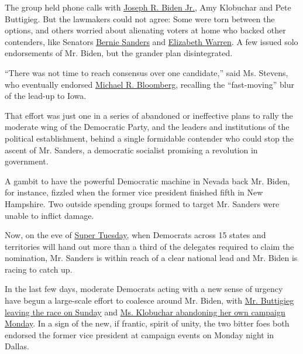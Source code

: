 The group held phone calls with
\href{https://www.nytimes3xbfgragh.onion/2020/03/03/podcasts/the-daily/the-stakes-on-super-tuesday.html}{Joseph
R. Biden Jr.}, Amy Klobuchar and Pete Buttigieg. But the lawmakers could
not agree: Some were torn between the options, and others worried about
alienating voters at home who backed other contenders, like Senators
\href{https://www.nytimes3xbfgragh.onion/interactive/2020/us/elections/bernie-sanders.html}{Bernie
Sanders} and
\href{https://www.nytimes3xbfgragh.onion/interactive/2020/us/elections/elizabeth-warren.html}{Elizabeth
Warren}. A few issued solo endorsements of Mr. Biden, but the grander
plan disintegrated.

``There was not time to reach consensus over one candidate,'' said Ms.
Stevens, who eventually endorsed
\href{https://www.nytimes3xbfgragh.onion/interactive/2020/us/elections/michael-bloomberg.html}{Michael
R. Bloomberg}, recalling the ``fast-moving'' blur of the lead-up to
Iowa.

That effort was just one in a series of abandoned or ineffective plans
to rally the moderate wing of the Democratic Party, and the leaders and
institutions of the political establishment, behind a single formidable
contender who could stop the ascent of Mr. Sanders, a democratic
socialist promising a revolution in government.

A gambit to have the powerful Democratic machine in Nevada back Mr.
Biden, for instance, fizzled when the former vice president finished
fifth in New Hampshire. Two outside spending groups formed to target Mr.
Sanders were unable to inflict damage.

Now, on the eve of
\href{https://www.nytimes3xbfgragh.onion/live/2020/super-tuesday-03-03}{Super
Tuesday}, when Democrats across 15 states and territories will hand out
more than a third of the delegates required to claim the nomination, Mr.
Sanders is within reach of a clear national lead and Mr. Biden is racing
to catch up.

In the last few days, moderate Democrats acting with a new sense of
urgency have begun a large-scale effort to coalesce around Mr. Biden,
with
\href{https://www.nytimes3xbfgragh.onion/2020/03/01/us/politics/pete-buttigieg-drops-out.html}{Mr.
Buttigieg leaving the race on Sunday} and
\href{https://www.nytimes3xbfgragh.onion/2020/03/02/us/politics/amy-klobuchar-drops-out.html}{Ms.
Klobuchar abandoning her own campaign Monday}. In a sign of the new, if
frantic, spirit of unity, the two bitter foes both endorsed the former
vice president at campaign events on Monday night in Dallas.


